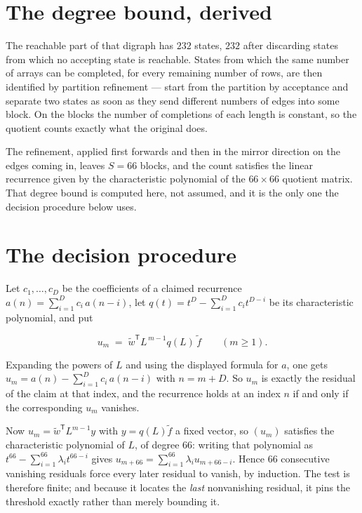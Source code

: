 \documentclass[11pt]{article}
\theoremstyle{definition}
\begin{document}
\section{The degree bound, derived}

The reachable part of that digraph has $232$ states, $232$ after discarding states from which no accepting state is reachable. States from which the same number of arrays can be completed, for every remaining number of rows, are then identified by partition refinement --- start from the partition by acceptance and separate two states as soon as they send different numbers of edges into some block. On the blocks the number of completions of each length is constant, so the quotient counts exactly what the original does.

The refinement, applied first forwards and then in the mirror direction on the edges coming in, leaves $S = 66$ blocks, and the count satisfies the linear recurrence given by the characteristic polynomial of the $66 \times 66$ quotient matrix. That degree bound is computed here, not assumed, and it is the only one the decision procedure below uses.

\section{The decision procedure}

Let $c_1,\dots,c_D$ be the coefficients of a claimed recurrence $a(n) = \sum_{i=1}^{D} c_i\,a(n-i)$, let $q(t) = t^{D} - \sum_{i=1}^{D} c_i t^{D-i}$ be its characteristic polynomial, and put

\[u_m \;=\; \tilde w^{\mathsf T} L^{\,m-1} q(L)\,\tilde f \qquad (m \ge 1).\]

Expanding the powers of $L$ and using the displayed formula for $a$, one gets $u_m = a(n) - \sum_{i=1}^{D} c_i\,a(n-i)$ with $n = m + D$. So $u_m$ is exactly the residual of the claim at that index, and the recurrence holds at an index $n$ if and only if the corresponding $u_m$ vanishes.

Now $u_m = \tilde w^{\mathsf T} L^{m-1} y$ with $y = q(L)\tilde f$ a fixed vector, so $(u_m)$ satisfies the characteristic polynomial of $L$, of degree $66$: writing that polynomial as $t^{66} - \sum_{i=1}^{66} \lambda_i t^{66-i}$ gives $u_{m+66} = \sum_{i=1}^{66} \lambda_i u_{m+66-i}$. Hence $66$ consecutive vanishing residuals force every later residual to vanish, by induction. The test is therefore finite; and because it locates the {\itshape last} nonvanishing residual, it pins the threshold exactly rather than merely bounding it.
\end{document}
